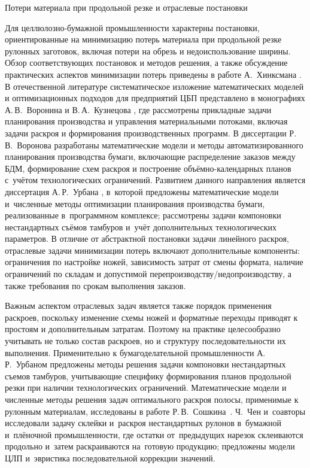 {Потери материала при продольной резке и отраслевые постановки}\label{subsec:theor_ch/trim_loss}

Для целлюлозно-бумажной промышленности характерны постановки, ориентированные на минимизацию потерь материала при продольной резке рулонных заготовок, включая потери на обрезь и недоиспользование ширины.
Обзор соответствующих постановок и методов решения, а также обсуждение практических аспектов минимизации потерь приведены в работе А.~Хинксмана \cite{hinxman1980trimloss}.
В отечественной литературе систематическое изложение математических моделей и оптимизационных подходов для предприятий ЦБП представлено в монографиях А.\,В.~Воронина и В.\,А.~Кузнецова \cite{воронин2000математические,воронин2000прикладные}, где рассмотрены прикладные задачи планирования производства и управления материальными потоками, включая задачи раскроя и формирования производственных программ.
В диссертации Р.\,В.~Воронова \cite{воронов2004диссертация} разработаны математические модели и методы автоматизированного планирования производства бумаги, включающие распределение заказов между БДМ, формирование схем раскроя и построение объёмно-календарных планов с~учётом технологических ограничений.
Развитием данного направления является диссертация А.\,Р.~Урбана \cite{урбан2015диссертация}, в~которой предложены математические модели и~численные методы оптимизации планирования производства бумаги, реализованные в~программном комплексе; рассмотрены задачи компоновки нестандартных съёмов тамбуров и~учёт дополнительных технологических параметров.
В отличие от абстрактной постановки задачи линейного раскроя, отраслевые задачи минимизации потерь включают дополнительные компоненты: ограничения по настройке ножей, зависимость затрат от смены формата, наличие ограничений по складам и допустимой перепроизводству/недопроизводству, а также требования по срокам выполнения заказов.

Важным аспектом отраслевых задач является также порядок применения раскроев, поскольку изменение схемы ножей и форматные переходы приводят к простоям и дополнительным затратам.
Поэтому на практике целесообразно учитывать не только состав раскроев, но и структуру последовательности их выполнения.
Применительно к бумагоделательной промышленности А.\,Р.~Урбаном \cite{ромолдович2015методы} предложены методы решения задачи компоновки нестандартных съемов тамбуров, учитывающие специфику формирования планов продольной резки при наличии технологических ограничений.
Математические модели и численные методы решения задач оптимального раскроя полосы, применимые к рулонным материалам, исследованы в работе Р.\,В.~Сошкина~\cite{сошкин2009математические}.
Ч.~Чен и~соавторы \cite{chen2019skiving} исследовали задачу склейки и~раскроя нестандартных рулонов в~бумажной и~плёночной промышленности, где остатки от~предыдущих нарезок склеиваются продольно и~затем раскраиваются на~готовую продукцию; предложены модели ЦЛП и~эвристика последовательной коррекции значений.

